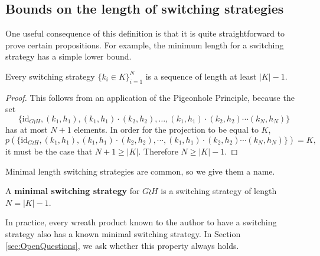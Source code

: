 \subsection{Bounds on the length of switching strategies}

One useful consequence of this definition is that it is quite straightforward to
prove certain propositions. For example, the minimum length for a switching strategy
has a simple lower bound.
\begin{proposition}
  Every switching strategy $\{k_i \in K\}_{i=1}^{N}$ is a sequence of
  length at least ${|K| - 1}$.
\end{proposition}
\begin{proof}
  This follows from an application of the Pigeonhole Principle, because the set
  \begin{equation}
    \{\mathrm{id}_{G \wr H}, (k_1, h_1), (k_1, h_1)\cdot(k_2, h_2), \ldots, (k_1, h_1)\cdot(k_2, h_2)\cdots(k_N, h_N)\}
  \end{equation}
  has at most $N+1$ elements. In order for the projection to be equal to $K$,
  \begin{equation}
    p(\{\mathrm{id}_{G \wr H}, (k_1, h_1), (k_1, h_1)\cdot(k_2, h_2), \cdots, (k_1, h_1)\cdot(k_2, h_2)\cdots(k_N, h_N)\}) = K,
  \end{equation} it must be the case that $N+1 \geq |K|$.
  Therefore $N \geq |K| - 1$.
\end{proof}

Minimal length switching strategies are common, so we give them a name.
\begin{definition}
  A \textbf{minimal switching strategy} for $G \wr H$ is a switching strategy
  of length $N = |K| - 1.$
\end{definition}

In practice, every wreath product known to the author to have a switching
strategy also has a known minimal switching strategy.
In Section \ref{sec:OpenQuestions}, we ask whether this property always holds.


